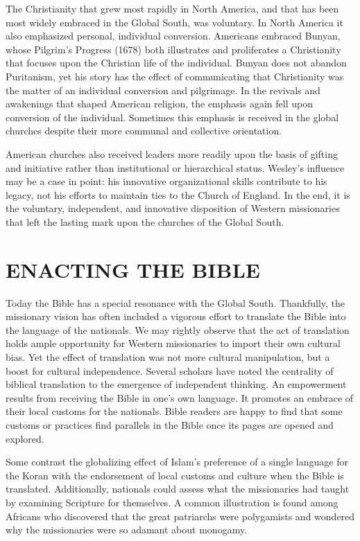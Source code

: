 The Christianity that grew most rapidly in North America, and that has been most widely embraced in
the Global South, was voluntary. In North America it also emphasized personal, individual
conversion. Americans embraced Bunyan, whose Pilgrim’s Progress (1678) both illustrates and
proliferates a Christianity that focuses upon the Christian life of the individual. Bunyan does not
abandon Puritanism, yet his story has the effect of communicating that Christianity was the matter
of an individual conversion and pilgrimage. In the revivals and awakenings that shaped American
religion, the emphasis again fell upon conversion of the individual. Sometimes this emphasis is
received in the global churches despite their more communal and collective orientation.

American churches also received leaders more readily upon the basis of gifting and initiative rather
than institutional or hierarchical status. Wesley’s influence may be a case in point: his innovative
organizational skills contribute to his legacy, not his efforts to maintain ties to the Church of
England. In the end, it is the voluntary, independent, and innovative disposition of Western
missionaries that left the lasting mark upon the churches of the Global South.

\section{ENACTING THE BIBLE}

Today the Bible has a special resonance with the Global South. Thankfully, the missionary vision has
often included a vigorous effort to translate the Bible into the language of the nationals. We may
rightly observe that the act of translation holds ample opportunity for Western missionaries to
import their own cultural bias. Yet the effect of translation was not more cultural manipulation,
but a boost for cultural independence. Several scholars have noted the centrality of biblical
translation to the emergence of independent thinking. An empowerment results from receiving the
Bible in one’s own language. It promotes an embrace of their local customs for the nationals. Bible
readers are happy to find that some customs or practices find parallels in the Bible once its pages
are opened and explored.

Some contrast the globalizing effect of Islam’s preference of a single language for the Koran with
the endorsement of local customs and culture when the Bible is translated. Additionally, nationals
could assess what the missionaries had taught by examining Scripture for themselves. A common
illustration is found among Africans who discovered that the great patriarchs were polygamists and
wondered why the missionaries were so adamant about monogamy.


